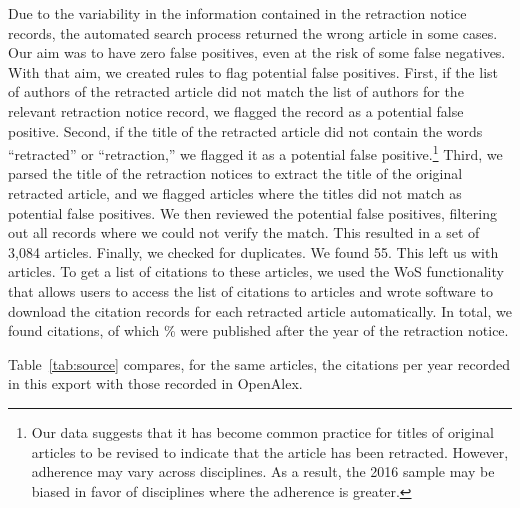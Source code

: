 \documentclass[11pt,letterpaper]{article}
\begin{document}
Due to the variability in the information contained in the retraction notice records, the automated search process returned the wrong article in some cases. Our aim was to have zero false positives, even at the risk of some false negatives. With that aim, we created rules to flag potential false positives. First, if the list of authors of the retracted article did not match the list of authors for the relevant retraction notice record, we flagged the record as a potential false positive. Second, if the title of the retracted article did not contain the words ``retracted'' or ``retraction,'' we flagged it as a potential false positive.\footnote{Our data suggests that it has become common practice for titles of original articles to be revised to indicate that the article has been retracted. However, adherence may vary across disciplines. As a result, the 2016 sample may be biased in favor of disciplines where the adherence is greater.} Third, we parsed the title of the retraction notices to extract the title of the original retracted article, and we flagged articles where the titles did not match as potential false positives. We then reviewed the potential false positives, filtering out all records where we could not verify the match. This resulted in a set of 3,084 articles. Finally, we checked for duplicates. We found 55. This left us with \WosNotices{} articles. To get a list of citations to these articles, we used the WoS functionality that allows users to access the list of citations to articles and wrote software to download the citation records for each retracted article automatically. In total, we found \WosCitationRecords{} citations, of which \WosShareAfterNotice\% were published after the year of the retraction notice.

Table~\ref{tab:source} compares, for the same articles, the citations per year recorded in this export with those recorded in OpenAlex.

\begin{table}[H]
\centering
\caption{Citations per year to the same articles in the 2016 Web of Science export and in OpenAlex, from each article's publication year through 2015. Ratio is OpenAlex over Web of Science; omitted where Web of Science recorded no citations.}
\label{tab:source}
\end{table}
\end{document}
